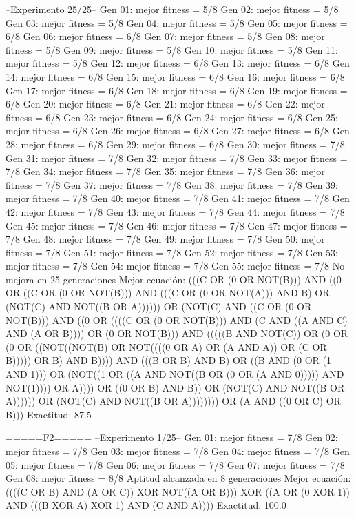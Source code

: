 --Experimento 
 25/25--
Gen 01: mejor fitness = 5/8
Gen 02: mejor fitness = 5/8
Gen 03: mejor fitness = 5/8
Gen 04: mejor fitness = 5/8
Gen 05: mejor fitness = 6/8
Gen 06: mejor fitness = 6/8
Gen 07: mejor fitness = 5/8
Gen 08: mejor fitness = 5/8
Gen 09: mejor fitness = 5/8
Gen 10: mejor fitness = 5/8
Gen 11: mejor fitness = 5/8
Gen 12: mejor fitness = 6/8
Gen 13: mejor fitness = 6/8
Gen 14: mejor fitness = 6/8
Gen 15: mejor fitness = 6/8
Gen 16: mejor fitness = 6/8
Gen 17: mejor fitness = 6/8
Gen 18: mejor fitness = 6/8
Gen 19: mejor fitness = 6/8
Gen 20: mejor fitness = 6/8
Gen 21: mejor fitness = 6/8
Gen 22: mejor fitness = 6/8
Gen 23: mejor fitness = 6/8
Gen 24: mejor fitness = 6/8
Gen 25: mejor fitness = 6/8
Gen 26: mejor fitness = 6/8
Gen 27: mejor fitness = 6/8
Gen 28: mejor fitness = 6/8
Gen 29: mejor fitness = 6/8
Gen 30: mejor fitness = 7/8
Gen 31: mejor fitness = 7/8
Gen 32: mejor fitness = 7/8
Gen 33: mejor fitness = 7/8
Gen 34: mejor fitness = 7/8
Gen 35: mejor fitness = 7/8
Gen 36: mejor fitness = 7/8
Gen 37: mejor fitness = 7/8
Gen 38: mejor fitness = 7/8
Gen 39: mejor fitness = 7/8
Gen 40: mejor fitness = 7/8
Gen 41: mejor fitness = 7/8
Gen 42: mejor fitness = 7/8
Gen 43: mejor fitness = 7/8
Gen 44: mejor fitness = 7/8
Gen 45: mejor fitness = 7/8
Gen 46: mejor fitness = 7/8
Gen 47: mejor fitness = 7/8
Gen 48: mejor fitness = 7/8
Gen 49: mejor fitness = 7/8
Gen 50: mejor fitness = 7/8
Gen 51: mejor fitness = 7/8
Gen 52: mejor fitness = 7/8
Gen 53: mejor fitness = 7/8
Gen 54: mejor fitness = 7/8
Gen 55: mejor fitness = 7/8
No mejora en 25 generaciones
Mejor ecuación: (((C OR (0 OR NOT(B))) AND ((0 OR ((C OR (0 OR NOT(B))) AND (((C OR (0 OR NOT(A))) AND B) OR (NOT(C) AND NOT((B OR A)))))) OR (NOT(C) AND ((C OR (0 OR NOT(B))) AND ((0 OR ((((C OR (0 OR NOT(B))) AND (C AND ((A AND C) AND (A OR B)))) OR (0 OR NOT(B))) AND (((((B AND NOT(C)) OR (0 OR (0 OR ((NOT((NOT(B) OR NOT((((0 OR A) OR (A AND A)) OR (C OR B))))) OR B) AND B)))) AND (((B OR B) AND B) OR ((B AND (0 OR (1 AND 1))) OR (NOT((1 OR ((A AND NOT((B OR (0 OR (A AND 0))))) AND NOT(1)))) OR A)))) OR ((0 OR B) AND B)) OR (NOT(C) AND NOT((B OR A)))))) OR (NOT(C) AND NOT((B OR A)))))))) OR (A AND ((0 OR C) OR B)))
 Exactitud: 87.5%

=====F2=====
--Experimento 
 1/25--
Gen 01: mejor fitness = 7/8
Gen 02: mejor fitness = 7/8
Gen 03: mejor fitness = 7/8
Gen 04: mejor fitness = 7/8
Gen 05: mejor fitness = 7/8
Gen 06: mejor fitness = 7/8
Gen 07: mejor fitness = 7/8
Gen 08: mejor fitness = 8/8
Aptitud alcanzada en 8 generaciones
Mejor ecuación: ((((C OR B) AND (A OR C)) XOR NOT((A OR B))) XOR ((A OR (0 XOR 1)) AND (((B XOR A) XOR 1) AND (C AND A))))
 Exactitud: 100.0%

